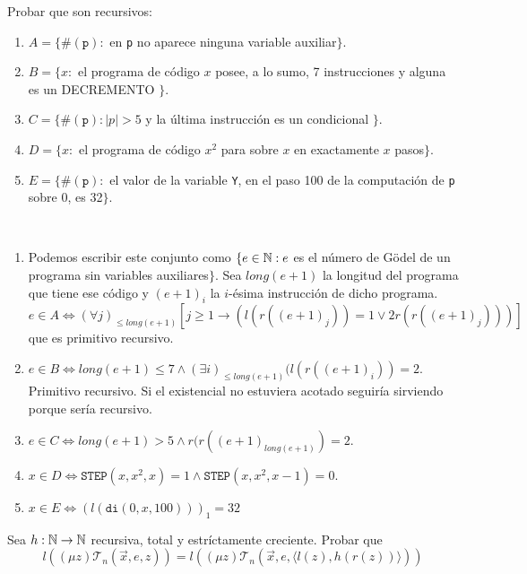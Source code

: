 \documentclass[twoside]{article}
\begin{document}
\newpage
\begin{ejercicio}{6}
Probar que son recursivos:
\begin{enumerate}
\item $A = \{\#(\texttt{p}) :$ en \texttt{p} no aparece ninguna variable auxiliar$\}$.
\item $B = \{x :$ el programa de código $x$ posee, a lo sumo, 7 instrucciones y alguna es un DECREMENTO $\}$.
\item $C = \{\#(\texttt{p}) : |p| > 5$ y la última instrucción es un condicional $\}$.
\item $D = \{x :$ el programa de código $x^2$ para sobre $x$ en exactamente $x$ pasos$\}$.
\item $E = \{\#(\texttt{p}) :$ el valor de la variable \texttt{Y}, en el paso 100 de la computación de \texttt{p} sobre 0, es 32$\}$.
\end{enumerate}
\end{ejercicio}
\begin{solucion}\
\begin{enumerate}
\item Podemos escribir este conjunto como $\{e\in\mathbb{N}: e$ es el número de Gödel de un programa sin variables auxiliares$\}$. Sea $long(e+1)$ la longitud del programa que tiene ese código y $(e+1)_i$ la $i$-ésima instrucción de dicho programa. $e\in A\Leftrightarrow(\forall j)_{\leq long(e+1)}[j\geq 1\rightarrow (l(r((e+1)_j))=1\lor 2r(r((e+1)_j)))]$ que es primitivo recursivo.
\item $e\in B\Leftrightarrow long(e+1)\leq 7 \land (\exists i)_{\leq long(e+1)}(l(r((e+1)_i))=2$. Primitivo recursivo. Si el existencial no estuviera acotado seguiría sirviendo porque sería recursivo.
\item $e\in C\Leftrightarrow long(e+1)>5\land r(r((e+1)_{long(e+1)})=2$.
\item $x\in D\Leftrightarrow \texttt{STEP}(x,x^2,x)=1\land \texttt{STEP}(x,x^2,x-1)=0$. 
\item $x\in E\Leftrightarrow (l(\texttt{di}(0,x,100)))_1=32$
\end{enumerate}
\end{solucion}
\newpage

\begin{ejercicio}{7}
Sea $h : \mathbb{N} \to \mathbb{N}$ recursiva, total y estríctamente creciente. Probar que
\[ l((μ z) \mathcal{T}_n(\vec{x},e,z)) = l((μ z) \mathcal{T}_n (\vec{x},e, \langle l(z),h(r(z))\rangle ))\]
\end{ejercicio}
\begin{solucion}
\end{solucion}
\end{document}
